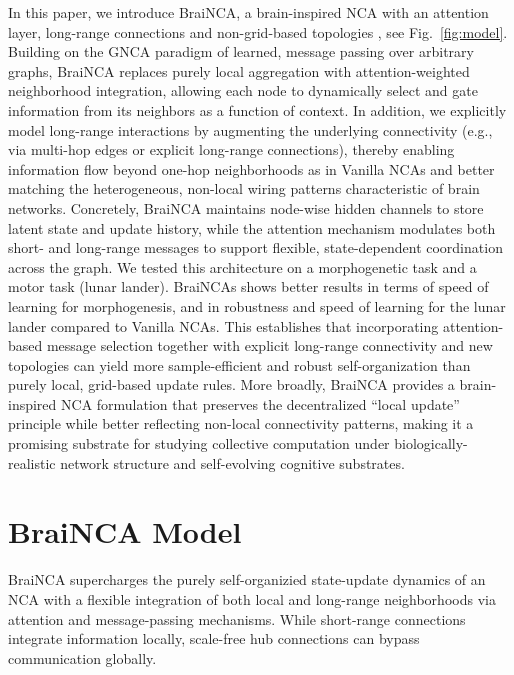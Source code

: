 \documentclass[letterpaper]{article}
\newcommand{\bh}[1]{{\color{black}#1}}  %
\begin{document}
In this paper, we introduce BraiNCA, a brain-inspired NCA with an attention layer, long-range connections and non-grid-based topologies \bh{, see Fig.~\ref{fig:model}}. Building on the GNCA paradigm of learned,  message passing over arbitrary graphs, BraiNCA replaces purely local aggregation with attention-weighted neighborhood integration, allowing each node to dynamically select and gate information from its neighbors as a function of context. In addition, we explicitly model long-range interactions by augmenting the underlying connectivity (e.g., via multi-hop edges or explicit long-range connections), thereby enabling information flow beyond one-hop neighborhoods as in Vanilla NCAs and better matching the heterogeneous, non-local wiring patterns characteristic of brain networks. Concretely, BraiNCA maintains node-wise hidden channels to store latent state and update history, while the attention mechanism modulates both short- and long-range messages to support flexible, state-dependent coordination across the graph. We tested this architecture on a morphogenetic task and a motor task (lunar lander). BraiNCAs shows better results in terms of speed of learning for morphogenesis, and in robustness and speed of learning for the lunar lander compared to Vanilla NCAs. This establishes that incorporating attention-based message selection together with explicit long-range connectivity and new topologies can yield more sample-efficient and robust self-organization than purely local, grid-based update rules.  More broadly, BraiNCA provides a brain-inspired NCA formulation that preserves the decentralized “local update” principle while better reflecting non-local connectivity patterns, making it a promising substrate for studying collective computation under biologically-realistic network structure and self-evolving cognitive substrates. 



\section{BraiNCA Model}

\bh{BraiNCA supercharges the purely self-organizied state-update dynamics of an NCA with a flexible integration of both local and long-range neighborhoods via attention and message-passing mechanisms.
While short-range connections integrate information locally, scale-free hub connections can bypass communication globally.}
\end{document}
